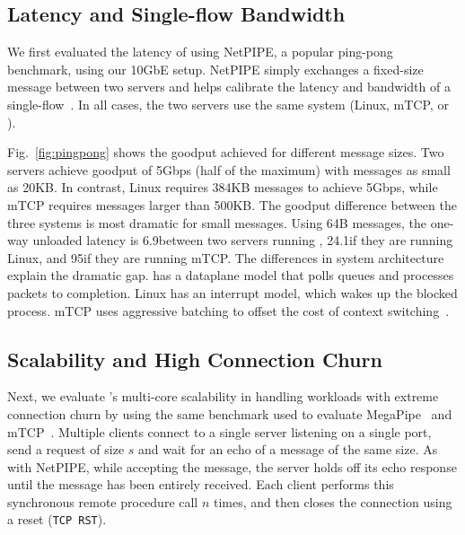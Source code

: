 \subsection{Latency and Single-flow Bandwidth}
\label{sec:eval:netpipe}

We first evaluated the latency of \ix using NetPIPE, a popular
ping-pong benchmark, using our 10GbE setup.  NetPIPE simply exchanges
a fixed-size message between two servers and helps calibrate the
latency and bandwidth of a single-flow~\cite{snell1996netpipe}.  In
all cases, the two servers use the same system (Linux, mTCP, or \ix).


Fig.~\ref{fig:pingpong} shows the goodput achieved for different
message sizes.  Two \ix servers achieve goodput of 5Gbps (half of the
maximum) with messages as small as 20KB. In contrast, Linux requires
384KB messages to achieve 5Gbps, while mTCP requires messages larger
than 500KB. The goodput difference between the three systems is most
dramatic for small messages. Using 64B messages, the one-way unloaded
latency is 6.9\microsecond between two servers running \ix,
24.1\microsecond if they are running Linux, and 95\microsecond if they
are running mTCP.  The differences in system architecture explain the
dramatic gap. \ix has a dataplane model that polls queues and
processes packets to completion. Linux has an interrupt model, which
wakes up the blocked process. mTCP uses aggressive batching to offset
the cost of context switching~\cite{jeong2014mtcp}.


\subsection{Scalability and High Connection Churn}
\label{sec:eval:short}


%

Next, we evaluate \ix's multi-core scalability in handling workloads
with extreme connection churn by using the same benchmark used to
evaluate MegaPipe~\cite{han2012megapipe} and
mTCP~\cite{jeong2014mtcp}. Multiple clients connect to a single server
listening on a single port, send a request of size $s$ and wait for an
echo of a message of the same size.  As with NetPIPE, while accepting
the message, the server holds off its echo response until the message
has been entirely received.  Each client performs this synchronous
remote procedure call $n$ times, and then closes the connection using a
reset (\texttt{TCP RST}).  


